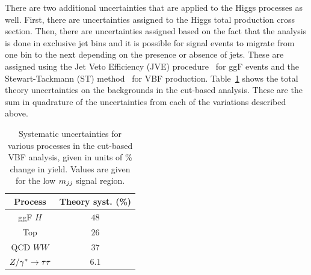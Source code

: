 
There are two additional uncertainties that are applied to the Higgs processes as well. First, there are uncertainties assigned to the Higgs total production cross section. Then, there are uncertainties assigned based on the fact that the analysis is done in exclusive jet bins and it is possible for signal events to migrate from one bin to the next depending on the presence or absence of jets. These are assigned using the Jet Veto Efficiency (JVE) procedure~\cite{LHCXSWG,JVE} for ggF events and the Stewart-Tackmann (ST) method~\cite{ST} for VBF production. Table~\ref{tab:vbf_cb_theosys} shows the total theory uncertainties on the backgrounds in the cut-based analysis. These are the sum in quadrature of the uncertainties from each of the variations described above. 


\begin{table}[h!]
\centering
\captionsetup{justification=centering}
\begin{tabular}{|c|c|}
\hline
Process & Theory syst. (\%)  \\ \hline
ggF $H$ & $48$ \\ \hline
Top & $26$ \\ \hline
QCD $WW$ & $37$ \\ \hline
$Z/\gamma^{\ast} \to \tau\tau$ & $6.1$ \\ \hline
\end{tabular}
\caption{Systematic uncertainties for various processes in the cut-based VBF analysis, given in units of \% change in yield. Values are given for the low $m_{jj}$ signal region.}
\label{tab:vbf_cb_theosys}
\end{table}

